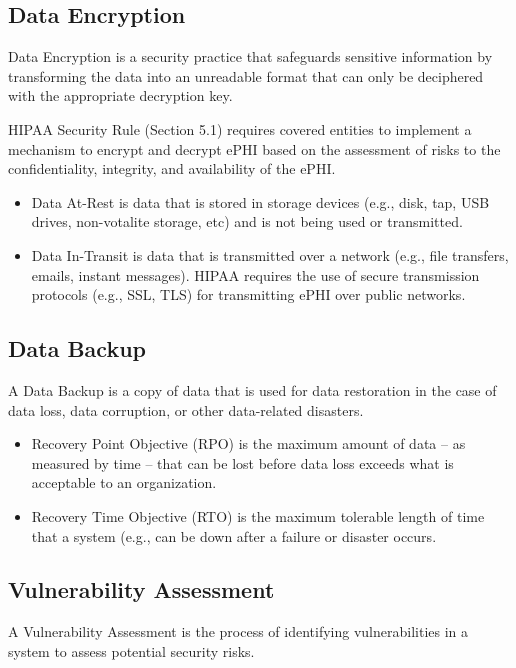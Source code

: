 \subsection{Data Encryption}

Data Encryption is a security practice that safeguards sensitive information by transforming the data into an unreadable format that can only be deciphered with the appropriate decryption key. 

HIPAA Security Rule (Section 5.1) requires covered entities to implement a mechanism to encrypt and decrypt ePHI based on the assessment of risks to the confidentiality, integrity, and availability of the ePHI. 

\begin{itemize}
    \item Data At-Rest is data that is stored in storage devices (e.g., disk, tap, USB drives, non-votalite storage, etc) and is not being used or transmitted.
    \item Data In-Transit is data that is transmitted over a network (e.g., file transfers, emails, instant messages). HIPAA requires the use of secure transmission protocols (e.g., SSL, TLS) for transmitting ePHI over public networks. 
\end{itemize}

\subsection{Data Backup}

A Data Backup is a copy of data that is used for data restoration in the case of data loss, data corruption, or other data-related disasters.

\begin{itemize}
    \item Recovery Point Objective (RPO) is the maximum amount of data – as measured by time – that can be lost before data loss exceeds what is acceptable to an organization.
    \item Recovery Time Objective (RTO) is the maximum tolerable length of time that a system (e.g., can be down after a failure or disaster occurs. 
\end{itemize}

\subsection{Vulnerability Assessment}
A Vulnerability Assessment is the process of identifying vulnerabilities in a system to assess potential security risks. 

